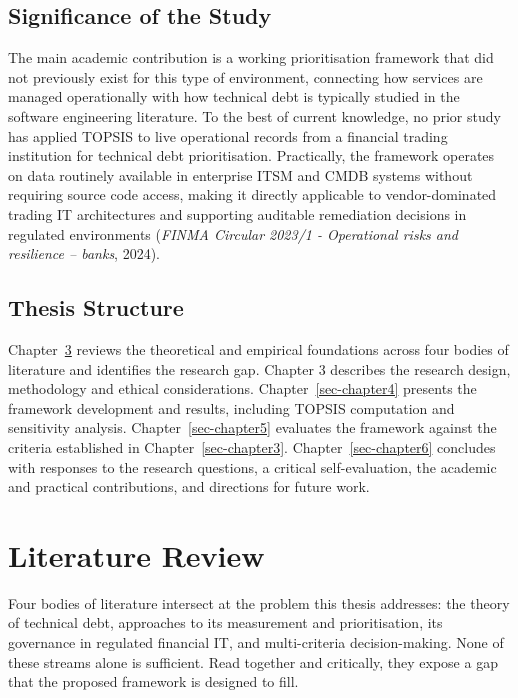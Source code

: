 \documentclass[
  12pt,
  letterpaper,
  12pt,
  oneside,
  english,
  onehalfspacing,
  headsepline]{MastersDoctoralThesis}
\begin{document}
\section{Significance of the Study}\label{significance-of-the-study}

The main academic contribution is a working prioritisation framework
that did not previously exist for this type of environment, connecting
how services are managed operationally with how technical debt is
typically studied in the software engineering literature. To the best of
current knowledge, no prior study has applied TOPSIS to live operational
records from a financial trading institution for technical debt
prioritisation. Practically, the framework operates on data routinely
available in enterprise ITSM and CMDB systems without requiring source
code access, making it directly applicable to vendor-dominated trading
IT architectures and supporting auditable remediation decisions in
regulated environments (\emph{{FINMA Circular} 2023/1 - {Operational}
risks and resilience -- banks}, 2024).

\section{Thesis Structure}\label{thesis-structure}

Chapter~\ref{sec-chapter2} reviews the theoretical and empirical
foundations across four bodies of literature and identifies the research
gap. Chapter 3 describes the research design, methodology and ethical
considerations. Chapter~\ref{sec-chapter4} presents the framework
development and results, including TOPSIS computation and sensitivity
analysis. Chapter~\ref{sec-chapter5} evaluates the framework against the
criteria established in Chapter~\ref{sec-chapter3}.
Chapter~\ref{sec-chapter6} concludes with responses to the research
questions, a critical self-evaluation, the academic and practical
contributions, and directions for future work.


\chapter{Literature Review}\label{sec-chapter2}

Four bodies of literature intersect at the problem this thesis
addresses: the theory of technical debt, approaches to its measurement
and prioritisation, its governance in regulated financial IT, and
multi-criteria decision-making. None of these streams alone is
sufficient. Read together and critically, they expose a gap that the
proposed framework is designed to fill.
\end{document}
